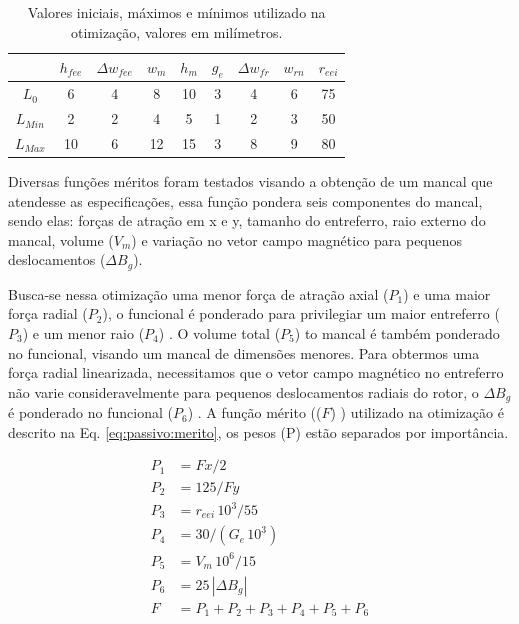\begin{table}[ht!]
	\centering
	\begin{tabular}{c c c c c c c c c}
		& $h_{fee}$ &$\Delta w_{fee}$ & $w_m$ & $h_m$  & $g_e$ & $\Delta w_{fr}$ & $w_{rn}$ & $r_{eei}$ \\ \hline \hline
		
		$L_{0}$ 	&  6 &   4 &    8 &    10 &   3 &  4 &   6 &    75 \\
		$L_{Min}$ &  2    &  2   &  4  &   5&    1  & 2  &  3&    50\\			
		$L_{Max}$ &  10 &  6 &  12  &   15  &  3  &  8  &   9   &   80		
	\end{tabular} 
	\caption{Valores iniciais, máximos e mínimos utilizado na otimização, valores em milímetros.}
	\label{tab:passivo:restrições} 
\end{table}

Diversas funções méritos foram testados visando a obtenção de um mancal que atendesse as especificações, essa função pondera seis componentes do mancal, sendo elas: forças de atração em x e y, tamanho do entreferro, raio externo do mancal,  volume ($V_m$) e variação no vetor campo magnético para pequenos deslocamentos ($\Delta B_{g}$).

Busca-se nessa otimização uma menor força de atração axial ($P_1$) e uma maior força radial ($P_2$), o funcional é ponderado para privilegiar um maior entreferro ($P_3$) e um menor raio ($P_4$) . O volume total ($P_5$) to mancal é também ponderado no funcional, visando um mancal de dimensões menores. Para obtermos uma força radial linearizada, necessitamos que o vetor campo magnético no entreferro não varie consideravelmente para pequenos deslocamentos radiais do rotor, o $\Delta B_{g}$ é ponderado no funcional ($P_6$) . A função mérito (($F$) ) utilizado na otimização é descrito na Eq. \ref{eq:passivo:merito},  os pesos (P) estão separados por importância.

\begin{align}
P_1 &= Fx/2 				\\ 
P_2 &= 125/Fy		\\        
P_3 &= r_{eei}\, 10^3/55 \\     
P_4&= 30/(G_e \,  10^3) \\    
P_5 &= V_m\, 10^6/15 \\        
P_6 &= 25 \,  |{\Delta B_{g}}|\\   
F &= P_1 + P_2 + P_3 + P_4 + P_5 + P_6   \label{eq:passivo:merito}
\end{align}

